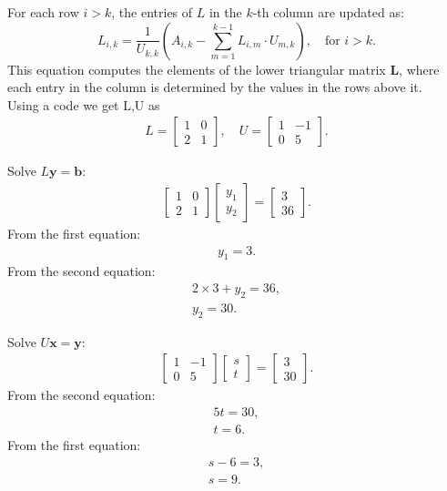 \documentclass[journal]{IEEEtran}
\begin{document}
For each row $ i > k $, the entries of $ L $ in the $ k $-th column are updated as:
\[
L_{i,k} = \frac{1}{U_{k,k}} \left( A_{i,k} - \sum_{m=1}^{k-1} L_{i,m} \cdot U_{m,k} \right), \quad \text{for } i > k.
\]
This equation computes the elements of the lower triangular matrix $ \mathbf{L} $, where each entry in the column is determined by the values in the rows above it.\\
Using a code we get L,U as 
\begin{align}
    L = \begin{bmatrix} 1 & 0 \\ 2 & 1 \end{bmatrix}, \quad
    U = \begin{bmatrix} 1 & -1 \\ 0 & 5 \end{bmatrix}.
\end{align}

Solve \(L\mathbf{y} = \mathbf{b}\):
\begin{align}
    \begin{bmatrix} 1 & 0 \\ 2 & 1 \end{bmatrix} \begin{bmatrix} y_1 \\ y_2 \end{bmatrix} = \begin{bmatrix} 3 \\ 36 \end{bmatrix}.
\end{align}
From the first equation:
\begin{align}
    y_1 = 3.
\end{align}
From the second equation:
\begin{align}
    2 \times 3 + y_2 = 36, \\
    y_2 = 30.
\end{align}

Solve \(U\mathbf{x} = \mathbf{y}\):
\begin{align}
    \begin{bmatrix} 1 & -1 \\ 0 & 5 \end{bmatrix} \begin{bmatrix} s \\ t \end{bmatrix} = \begin{bmatrix} 3 \\ 30 \end{bmatrix}.
\end{align}
From the second equation:
\begin{align}
    5t = 30, \\
    t = 6.
\end{align}
From the first equation:
\begin{align}
    s - 6 = 3, \\
    s = 9.
\end{align}
\end{document}
